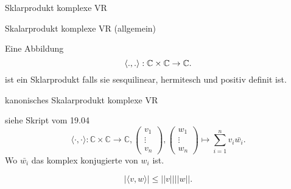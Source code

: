 \documentclass[class=article, crop=false]{standalone}
\begin{document}
\begin{zettel}{Sklarprodukt komplexe VR}
\begin{flashcard}
	\begin{question}
		Skalarprodukt komplexe VR (allgemein)
	\end{question}
	\begin{definition}
		Eine Abbildung
		\[
			\langle .,.\rangle : \mathbb{C} \times \mathbb{C} \to \mathbb{C}
		.\]
		ist ein Sklarprodukt falls sie sesquilinear, hermitesch und positiv definit ist.
	\end{definition}
\end{flashcard}

\begin{flashcard}
	\begin{question}
		kanonisches Skalarprodukt komplexe VR
	\end{question}
	\begin{definition}
		siehe Skript vom 19.04
		\[
			\langle \cdot,\cdot\rangle : \mathbb{C} \times \mathbb{C} \longrightarrow  \mathbb{C}, \begin{pmatrix}v_1 \\ \vdots \\ v_n\end{pmatrix}, \begin{pmatrix}w_1 \\ \vdots \\ w_n\end{pmatrix} \mapsto \sum_{i = 1}^{n} v_i \bar{w_i}
		.\]
		Wo $ \bar{w_i} $ das komplex konjugierte von $w_i $ ist.
	\end{definition}
\end{flashcard}
\begin{lemma}
	\[
		|\langle v,w\rangle| \leq  ||v|| ||w||
	.\]

\end{lemma}
\end{zettel}
\end{document}
